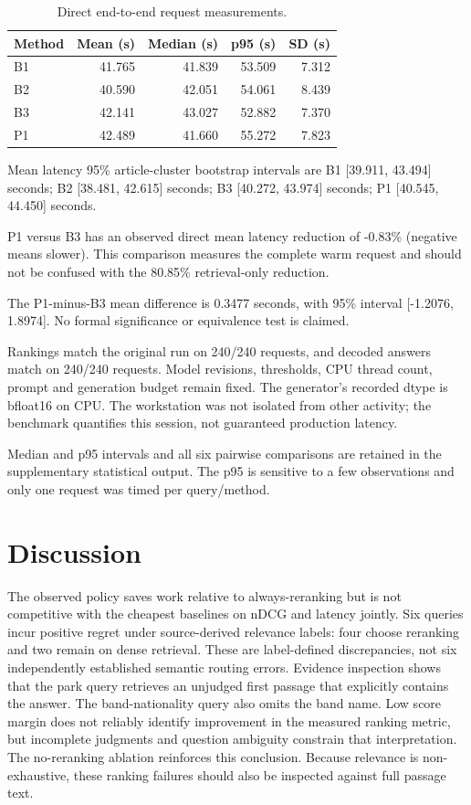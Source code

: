 \documentclass[10pt,a4paper]{article}
\begin{document}
\begin{table}[t]
\centering
\caption{Direct end-to-end request measurements.}\label{tab:3}
\small\setlength{\tabcolsep}{3pt}
\begin{tabular}{lrrrr}
\toprule
Method & Mean (s) & Median (s) & p95 (s) & SD (s) \\
\midrule
B1 & 41.765 & 41.839 & 53.509 & 7.312 \\
B2 & 40.590 & 42.051 & 54.061 & 8.439 \\
B3 & 42.141 & 43.027 & 52.882 & 7.370 \\
P1 & 42.489 & 41.660 & 55.272 & 7.823 \\
\bottomrule
\end{tabular}
\end{table}


Mean latency 95\% article-cluster bootstrap intervals are B1 {[}39.911,
43.494{]} seconds; B2 {[}38.481, 42.615{]} seconds; B3 {[}40.272,
43.974{]} seconds; P1 {[}40.545, 44.450{]} seconds.

P1 versus B3 has an observed direct mean latency reduction of -0.83\%
(negative means slower). This comparison measures the complete warm
request and should not be confused with the 80.85\% retrieval-only
reduction.

The P1-minus-B3 mean difference is 0.3477 seconds, with 95\% interval
{[}-1.2076, 1.8974{]}. No formal significance or equivalence test is
claimed.

Rankings match the original run on 240/240 requests, and decoded answers
match on 240/240 requests. Model revisions, thresholds, CPU thread
count, prompt and generation budget remain fixed. The generator's
recorded dtype is bfloat16 on CPU. The workstation was not isolated from
other activity; the benchmark quantifies this session, not guaranteed
production latency.

Median and p95 intervals and all six pairwise comparisons are retained
in the supplementary statistical output. The p95 is sensitive to a few
observations and only one request was timed per query/method.

\hypertarget{discussion}{%
\section{Discussion}\label{discussion}}

The observed policy saves work relative to always-reranking but is not
competitive with the cheapest baselines on nDCG and latency jointly. Six
queries incur positive regret under source-derived relevance labels:
four choose reranking and two remain on dense retrieval. These are
label-defined discrepancies, not six independently established semantic
routing errors. Evidence inspection shows that the park query retrieves
an unjudged first passage that explicitly contains the answer. The
band-nationality query also omits the band name. Low score margin does
not reliably identify improvement in the measured ranking metric, but
incomplete judgments and question ambiguity constrain that
interpretation. The no-reranking ablation reinforces this conclusion.
Because relevance is non-exhaustive, these ranking failures should also
be inspected against full passage text.
\end{document}
